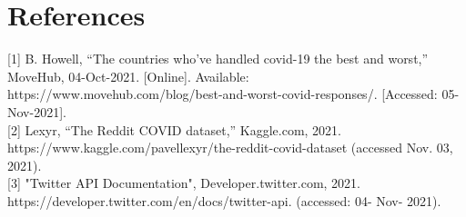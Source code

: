 \documentclass[fontsize=11pt]{article}
\begin{document}
\section*{References}

[1]
B. Howell, “The countries who've handled covid-19 the best and worst,” MoveHub, 04-Oct-2021. [Online]. Available: https://www.movehub.com/blog/best-and-worst-covid-responses/. [Accessed: 05-Nov-2021]. 
\\

[2]
Lexyr, “The Reddit COVID dataset,” Kaggle.com, 2021. https://www.kaggle.com/pavellexyr/the-reddit-covid-dataset (accessed Nov. 03, 2021).
\\


[3]
 "Twitter API Documentation", Developer.twitter.com, 2021.
https://developer.twitter.com/en/docs/twitter-api. (accessed: 04- Nov- 2021).

\end{document}
